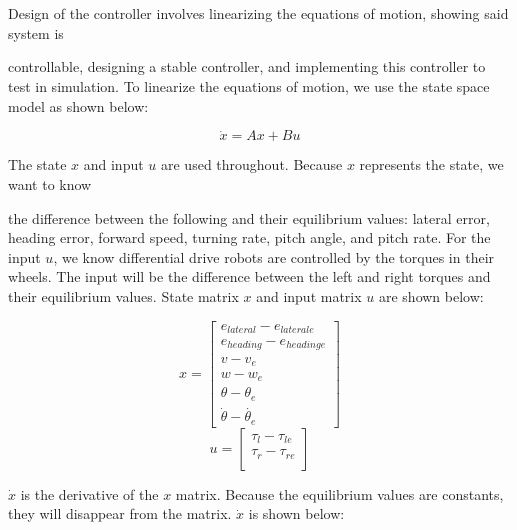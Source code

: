 \documentclass[10pt, letterbox]{article}
\begin{document}
\section{}
\begin{addmargin}[5em]{0em}
Design of the controller involves linearizing the equations of motion, showing said system is \end{addmargin} controllable, designing a stable controller, and implementing this controller to test in simulation. To linearize the equations of motion, we use the state space model as shown below:\\
\begin{center}
\begin{equation}
\dot{x} = Ax + Bu
\end{equation}
\end{center}
\begin{addmargin}[5em]{0em}
The state $x$ and input $u$ are used throughout. Because $x$ represents the state, we want to know \end{addmargin} the difference between the following and their equilibrium values: lateral error, heading error, forward speed, turning rate, pitch angle, and pitch rate. For the input $u$, we know differential drive robots are controlled by the torques in their wheels. The input will be the difference between the left and right torques and their equilibrium values. State matrix $x$ and input matrix $u$ are shown below:
\begin{center}
\begin{equation}
x = 
\begin{bmatrix} 
e_{lateral} - 
e_{lateral e} \\ 
e_{heading} -
e_{heading e} \\ 
v - v_{e} \\ 
w - w_{e} \\ 
\theta - \theta_{e}\\
\dot{\theta} - \dot{\theta_{e}}
\end{bmatrix}
\end{equation}
\begin{equation}
u = 
\begin{bmatrix} 
\tau_l - \tau_{le} \\
\tau_r - \tau_{re}  \\
\end{bmatrix}
\end{equation}
\end{center}
$\dot{x}$ is the derivative of the $x$ matrix. Because the equilibrium values are constants, they will disappear from the matrix. $\dot{x}$ is shown below:
\end{document}
